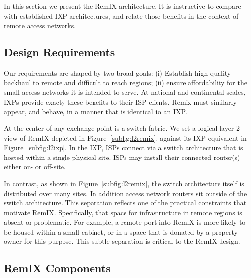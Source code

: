 In this section we present the RemIX architecture. It is instructive to compare with established IXP architectures, and relate those benefits in the context of remote access networks.

\subsection{Design Requirements}

Our requirements are shaped by two broad goals: (i) Establish high-quality
backhaul to remote and difficult to reach regions; (ii) ensure affordability
for the small access networks it is intended to serve. At national and
continental scales, IXPs provide exacty these benefits to their ISP clients. Remix must similarly appear, and behave, in a manner that is identical to an IXP.


At the center of any exchange point is a switch fabric. We set a logical layer-2
view of RemIX depicted in Figure~\ref{subfig:l2remix}, against its IXP
equivalent in Figure~\ref{subfig:l2ixp}. In the IXP, ISPs connect via a switch
architecture that is hosted within a single physical site. ISPs may install
their connected router(s) either on- or off-site.

In contrast, as shown in Figure~\ref{subfig:l2remix}, the switch architecture
itself is distributed over many sites. In addition access network routers sit
outside of the switch architecture. This separation reflects one of the
practical constraints that motivate RemIX. Specifically, that space for
infrastructure in remote regions is absent or problematic. For example, a remote
port into RemIX is more likely to be housed within a small cabinet, or in a
space that is donated by a property owner for this purpose. This subtle separation is critical to the RemIX design. 


\subsection{RemIX Components}

